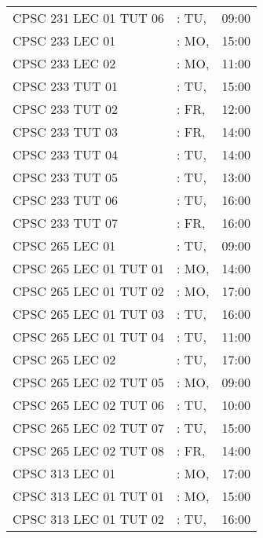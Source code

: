 \documentclass[11pt]{article}
\begin{document}
\begin{longtable}{l l r}
CPSC 231 LEC 01 TUT 06        &\hspace*{1.5cm}:  TU,& 09:00\tabularnewline
CPSC 233 LEC 01               &\hspace*{1.5cm}: MO,& 15:00\tabularnewline
CPSC 233 LEC 02               &\hspace*{1.5cm}:   MO,& 11:00\tabularnewline
CPSC 233 TUT 01               &\hspace*{1.5cm}:   TU,& 15:00\tabularnewline
CPSC 233 TUT 02               &\hspace*{1.5cm}:   FR,& 12:00\tabularnewline
CPSC 233 TUT 03               &\hspace*{1.5cm}:   FR,& 14:00\tabularnewline
CPSC 233 TUT 04               &\hspace*{1.5cm}:   TU,& 14:00\tabularnewline
CPSC 233 TUT 05               &\hspace*{1.5cm}:   TU,& 13:00\tabularnewline
CPSC 233 TUT 06               &\hspace*{1.5cm}:   TU,& 16:00\tabularnewline
CPSC 233 TUT 07               &\hspace*{1.5cm}:  FR,& 16:00\tabularnewline
CPSC 265 LEC 01               &\hspace*{1.5cm}:  TU,& 09:00\tabularnewline
CPSC 265 LEC 01 TUT 01        &\hspace*{1.5cm}:  MO,& 14:00\tabularnewline
CPSC 265 LEC 01 TUT 02        &\hspace*{1.5cm}:  MO,& 17:00\tabularnewline
CPSC 265 LEC 01 TUT 03        &\hspace*{1.5cm}:  TU,& 16:00\tabularnewline
CPSC 265 LEC 01 TUT 04        &\hspace*{1.5cm}:  TU,& 11:00\tabularnewline
CPSC 265 LEC 02               &\hspace*{1.5cm}:  TU,& 17:00\tabularnewline
CPSC 265 LEC 02 TUT 05        &\hspace*{1.5cm}:  MO,& 09:00\tabularnewline
CPSC 265 LEC 02 TUT 06        &\hspace*{1.5cm}:  TU,& 10:00\tabularnewline
CPSC 265 LEC 02 TUT 07        &\hspace*{1.5cm}:  TU,& 15:00\tabularnewline
CPSC 265 LEC 02 TUT 08        &\hspace*{1.5cm}:  FR,& 14:00\tabularnewline
CPSC 313 LEC 01               &\hspace*{1.5cm}:  MO,& 17:00\tabularnewline
CPSC 313 LEC 01 TUT 01        &\hspace*{1.5cm}:  MO,& 15:00\tabularnewline
CPSC 313 LEC 01 TUT 02        &\hspace*{1.5cm}:  TU,& 16:00\tabularnewline

\end{longtable}
\end{document}
